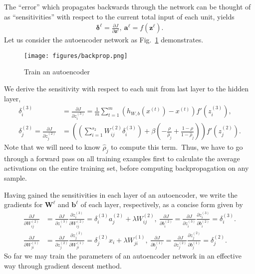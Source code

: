 The ``error'' which propagates backwards through the network can be thought of as ``sensitivities'' with respect to the current total input of each unit, yields
\begin{align}
	\bm{\delta}^\ell = \frac{\partial J}{\partial \bm{z}^\ell},~\bm{a}^\ell = f(\bm{z}^\ell).
\end{align}
Let us consider the autoencoder network as Fig.~\ref{fig:train_autoencoder} demonstrates.
\begin{figure}[htbp]
	\centering
	\texttt{[image: figures/backprop.png]}
	\caption{Train an autoencoder} \label{fig:train_autoencoder}
\end{figure}
We derive the sensitivity with respect to each unit from last layer to the hidden layer,
\begin{align}
\delta^{(3)}_i &= \frac{\partial J}{\partial z_i^{(3)}}= \frac{1}{m} \sum_{t=1}^{m}( h_{W,b}(x^{(t)})- x^{(t)} ) f'(z^{(3)}_i), \\
\delta^{(2)}_j = \frac{\partial J}{\partial z_j^{(2)}} &= \left( \left( \sum_{i=1}^{s_{2}} W^{(2)}_{ij} \delta^{(3)}_i \right) + \beta \left( - \frac{\rho}{\hat\rho_j} + \frac{1-\rho}{1-\hat\rho_j} \right) \right) f'(z^{(2)}_j) .
\end{align}
Note that we will need to know $\hat{\rho}_j$ to compute this term.~Thus, we have to go through a forward pass on all training examples first to calculate the average activations on the entire training set, before computing backpropagation on any sample.

Having gained the sensitivities in each layer of an autoencoder, we write the gradients for $\bm{W}^{\ell}$ and $\bm{b}^{\ell}$ of each layer, respectively, as a concise form given by
\begin{align}
\frac{\partial J}{\partial W_{ij}^{(2)}} &= \frac{\partial J}{\partial z_i^{(3)}}  \frac{\partial z_i^{(3)}}{\partial W_{ij}^{(2)}} = \delta^{(3)}_i a_{j}^{(2)} + \lambda W_{ij}^{(2)},~\frac{\partial J}{\partial b_{i}^{(2)}} = \frac{\partial J}{\partial z_i^{(3)}} \frac{\partial z_i^{(3)}}{\partial b_{i}^{(2)}} = \delta^{(3)}_i. \\
\frac{\partial J}{\partial W_{ji}^{(1)}} &= \frac{\partial J}{\partial z_j^{(2)}} \frac{\partial z_j^{(2)}}{\partial W_{ji}^{(1)}} = \delta^{(2)}_j x_{i} + \lambda W_{ji}^{(1)},~\frac{\partial J}{\partial b_{j}^{(1)}} = \frac{\partial J}{\partial z_j^{(2)}} \frac{\partial z_j^{(2)}}{\partial b_{j}^{(1)}} = \delta^{(2)}_j.
\end{align}
So far we may train the parameters of an autoencoder network in an effective way through gradient descent method.

